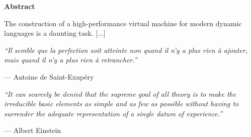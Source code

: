 \begin{center}
\textbf{\large Abstract}
\end{center}

The construction of a high-performance virtual machine for modern dynamic
languages is a daunting task. [...]


\vspace{1cm}

\emph{``Il semble que la perfection soit atteinte non quand il n'y a plus rien
\`a ajouter, mais quand il n'y a plus rien \`a retrancher.''}

\hfill --- Antoine de Saint-Exup\'ery

\emph{``It can scarcely be denied that the supreme goal of all theory is to
make the irreducible basic elements as simple and as few as possible without
having to surrender the adequate representation of a single datum of
experience.''}

\hfill --- Albert Einstein
